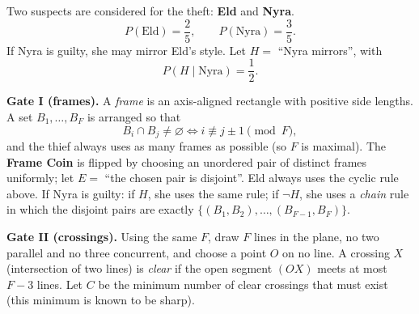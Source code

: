 

\Problem
\small
Two suspects are considered for the theft: \textbf{Eld} and \textbf{Nyra}.
\[
P(\text{Eld})=\frac25,\qquad P(\text{Nyra})=\frac35.
\]
If Nyra is guilty, she may mirror Eld's style. Let \(H=\) “Nyra mirrors”, with
\[
P(H\mid\text{Nyra})=\frac12.
\]

\medskip
\noindent\textbf{Gate I (frames).}
A \emph{frame} is an axis-aligned rectangle with positive side lengths.
A set \(B_1,\dots,B_F\) is arranged so that
\[
B_i\cap B_j\neq\varnothing \iff i\not\equiv j\pm1\pmod F,
\]
and the thief always uses as many frames as possible (so \(F\) is maximal).
The \textbf{Frame Coin} is flipped by choosing an unordered pair of distinct frames uniformly;
let \(E=\) “the chosen pair is disjoint”.
Eld always uses the cyclic rule above. If Nyra is guilty: if \(H\), she uses the same rule; if \(\neg H\),
she uses a \emph{chain} rule in which the disjoint pairs are exactly
\(\{(B_1,B_2),\dots,(B_{F-1},B_F)\}\).

\medskip
\noindent\textbf{Gate II (crossings).}
Using the same \(F\), draw \(F\) lines in the plane, no two parallel and no three concurrent,
and choose a point \(O\) on no line.
A crossing \(X\) (intersection of two lines) is \emph{clear} if the open segment \((OX)\) meets at most \(F-3\) lines.
Let \(C\) be the minimum number of clear crossings that must exist (this minimum is known to be sharp).

